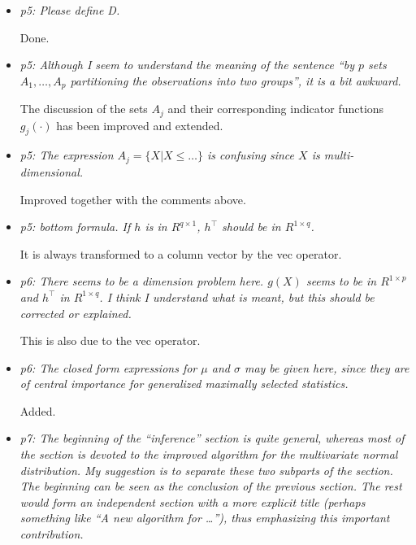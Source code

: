 \documentclass[11pt,a4paper]{article}
\begin{document}
\begin{itemize}
  
  \item \textit{p5: Please define D.}
        
	Done.
	
  \item \textit{p5: Although I seem to understand the meaning of the sentence
        ``by $p$ sets $A_1, \dots , A_p$ partitioning the observations into two
	groups'', it is a bit awkward.}
	
	The discussion of the sets $A_j$ and their corresponding indicator functions
	$g_j(\cdot)$ has been improved and extended.
	
  \item \textit{p5: The expression $A_j = \{ X | X \le \dots\}$ is confusing since
        $X$ is multi-dimensional.}
	
	Improved together with the comments above.
	
  \item \textit{p5: bottom formula. If $h$ is in $R^{q \times 1}$, $h^\top$ should be
        in $R^{1 \times q}$.}
	
	It is always transformed to a column vector by the vec operator.
	
  \item \textit{p6: There seems to be a dimension problem here. $g(X)$ seems to be
        in $R^{1 \times p}$ and $h^\top$ in $R^{1 \times q}$. I think I understand
	what is meant, but this should be corrected or explained.}
	
	This is also due to the vec operator.
	
  \item \textit{p6: The closed form expressions for $\mu$ and $\sigma$ may be
        given here, since they are of central importance for generalized maximally
	selected statistics.}
	
	Added.
	
  \item \textit{p7: The beginning of the ``inference'' section is quite general,
        whereas most of the section is devoted to the improved algorithm for the
	multivariate normal distribution. My suggestion is to separate these two
	subparts of the section. The beginning can be seen as the conclusion of
	the previous section. The rest would form an independent section with a
	more explicit title (perhaps something like ``A new algorithm for \dots''),
	thus emphasizing this important contribution.}
	

\end{itemize}
\end{document}
